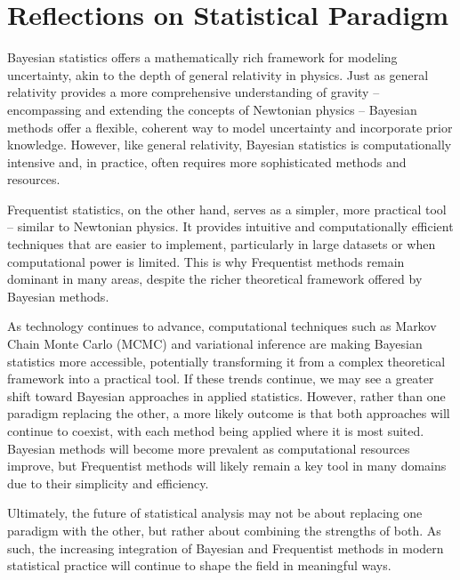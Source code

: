 \chapter{Reflections on Statistical Paradigm}
Bayesian statistics offers a mathematically rich framework for modeling uncertainty, akin to the depth of general relativity in physics. Just as general relativity provides a more comprehensive understanding of gravity -- encompassing and extending the concepts of Newtonian physics -- Bayesian methods offer a flexible, coherent way to model uncertainty and incorporate prior knowledge. However, like general relativity, Bayesian statistics is computationally intensive and, in practice, often requires more sophisticated methods and resources.

Frequentist statistics, on the other hand, serves as a simpler, more practical tool -- similar to Newtonian physics. It provides intuitive and computationally efficient techniques that are easier to implement, particularly in large datasets or when computational power is limited. This is why Frequentist methods remain dominant in many areas, despite the richer theoretical framework offered by Bayesian methods.

As technology continues to advance, computational techniques such as Markov Chain Monte Carlo (MCMC) and variational inference are making Bayesian statistics more accessible, potentially transforming it from a complex theoretical framework into a practical tool. If these trends continue, we may see a greater shift toward Bayesian approaches in applied statistics. However, rather than one paradigm replacing the other, a more likely outcome is that both approaches will continue to coexist, with each method being applied where it is most suited. Bayesian methods will become more prevalent as computational resources improve, but Frequentist methods will likely remain a key tool in many domains due to their simplicity and efficiency.

Ultimately, the future of statistical analysis may not be about replacing one paradigm with the other, but rather about combining the strengths of both. As such, the increasing integration of Bayesian and Frequentist methods in modern statistical practice will continue to shape the field in meaningful ways.